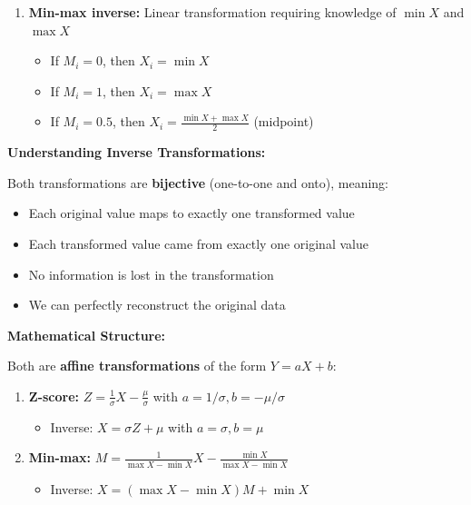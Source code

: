 \documentclass[12pt]{article}
\begin{document}
\begin{solution}
\begin{enumerate}
    \item \textbf{Min-max inverse:} Linear transformation requiring knowledge of \(\min X\) and \(\max X\)
    \begin{itemize}
        \item If \(M_i = 0\), then \(X_i = \min X\)
        \item If \(M_i = 1\), then \(X_i = \max X\)
        \item If \(M_i = 0.5\), then \(X_i = \frac{\min X + \max X}{2}\) (midpoint)
    \end{itemize}
\end{enumerate}
\end{solution}

\begin{explanation}
\textbf{Understanding Inverse Transformations:}

Both transformations are \textbf{bijective} (one-to-one and onto), meaning:
\begin{itemize}
    \item Each original value maps to exactly one transformed value
    \item Each transformed value came from exactly one original value
    \item No information is lost in the transformation
    \item We can perfectly reconstruct the original data
\end{itemize}

\textbf{Mathematical Structure:}

Both are \textbf{affine transformations} of the form \(Y = aX + b\):

\begin{enumerate}
    \item \textbf{Z-score:} \(Z = \frac{1}{\sigma}X - \frac{\mu}{\sigma}\) with \(a = 1/\sigma, b = -\mu/\sigma\)
    \begin{itemize}
        \item Inverse: \(X = \sigma Z + \mu\) with \(a = \sigma, b = \mu\)
    \end{itemize}

    \item \textbf{Min-max:} \(M = \frac{1}{\max X - \min X}X - \frac{\min X}{\max X - \min X}\)
    \begin{itemize}
        \item Inverse: \(X = (\max X - \min X)M + \min X\)
    \end{itemize}
\end{enumerate}


\end{explanation}
\end{document}
